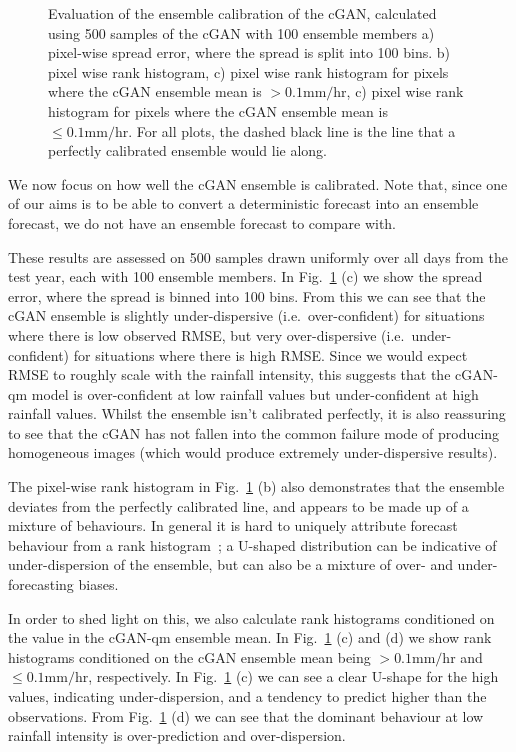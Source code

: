 \documentclass{article}
\begin{document}
\begin{figure}[!ht]
     
     \caption{Evaluation of the ensemble calibration of the cGAN, calculated using 500 samples of the cGAN with 100 ensemble members a) pixel-wise spread error, where the spread is split into 100 bins. b) pixel wise rank histogram, c) pixel wise rank histogram for pixels where the cGAN ensemble mean is $>0.1\text{mm/hr}$, c) pixel wise rank histogram for pixels where the cGAN ensemble mean is $\leq 0.1\text{mm/hr}$. For all plots, the dashed black line is the line that a perfectly calibrated ensemble would lie along. }
     \label{fig:ens_calib}
\end{figure}


We now focus on how well the cGAN ensemble is calibrated. Note that, since one of our aims is to be able to convert a deterministic forecast into an ensemble forecast, we do not have an ensemble forecast to compare with.

These results are assessed on 500 samples drawn uniformly over all days from the test year, each with 100 ensemble members. In Fig.~\ref{fig:ens_calib} (c) we show the spread error, where the spread is binned into 100 bins. From this we can see that the cGAN ensemble is slightly under-dispersive (i.e.~over-confident) for situations where there is low observed RMSE, but very over-dispersive (i.e.~under-confident) for situations where there is high RMSE. Since we would expect RMSE to roughly scale with the rainfall intensity, this suggests that the cGAN-qm model is over-confident at low rainfall values but under-confident at high rainfall values. Whilst the ensemble isn't calibrated perfectly, it is also reassuring to see that the cGAN has not fallen into the common failure mode of producing homogeneous images (which would produce extremely under-dispersive results).

The pixel-wise rank histogram in Fig.~\ref{fig:ens_calib} (b) also demonstrates that the ensemble deviates from the perfectly calibrated line, and appears to be made up of a mixture of behaviours. In general it is hard to uniquely attribute forecast behaviour from a rank histogram~\citep{hamill_interpretation_2001}; a U-shaped distribution can be indicative of under-dispersion of the ensemble, but can also be a mixture of over- and under-forecasting biases. 

In order to shed light on this, we also calculate rank histograms conditioned on the value in the cGAN-qm ensemble mean. In Fig.~\ref{fig:ens_calib} (c) and (d) we show rank histograms conditioned on the cGAN ensemble mean being $>0.1\text{mm/hr}$ and $\leq 0.1\text{mm/hr}$, respectively. In Fig.~\ref{fig:ens_calib} (c) we can see a clear U-shape for the high values, indicating under-dispersion, and a tendency to predict higher than the observations. From Fig.~\ref{fig:ens_calib} (d) we can see that the dominant behaviour at low rainfall intensity is over-prediction and over-dispersion. 
\end{document}
